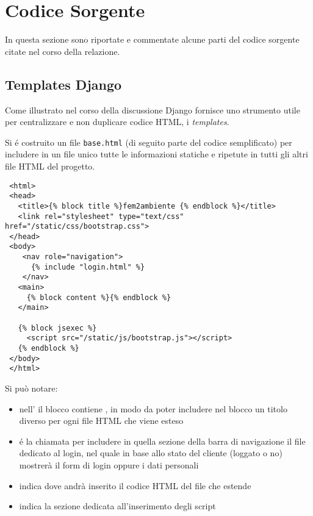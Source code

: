 \chapter{Codice Sorgente}
\label{app:codice}

In questa sezione sono riportate e commentate alcune parti del codice sorgente citate nel corso della relazione.

\section*{Templates Django}
\label{app:templates}

Come illustrato nel corso della discussione Django fornisce uno strumento utile per centralizzare e non duplicare codice HTML, i \emph{templates}.

Si é costruito un file \texttt{base.html} (di seguito parte del codice semplificato) per includere in un file unico tutte le informazioni statiche e ripetute in tutti gli altri file HTML del progetto.

\begin{footnotesize}
\begin{verbatim}
 <html>
 <head>
   <title>{% block title %}fem2ambiente {% endblock %}</title>
   <link rel="stylesheet" type="text/css" href="/static/css/bootstrap.css">
 </head>
 <body>
    <nav role="navigation">                        
      {% include "login.html" %}
    </nav>   
   <main>
     {% block content %}{% endblock %}
   </main>

   {% block jsexec %}
     <script src="/static/js/bootstrap.js"></script>
   {% endblock %}
 </body>
 </html>
\end{verbatim}
\end{footnotesize}

Si può notare:
\begin{itemize}
 \item nell' il blocco  contiene , in modo da poter includere nel blocco un titolo diverso per ogni file HTML che viene esteso
 \item {} é la chiamata per includere in quella sezione della barra di navigazione il file dedicato al login, nel quale in base allo stato del cliente (loggato o no) mostrerà il form di login oppure i dati personali
 \item {} indica dove andrà inserito il codice HTML del file che estende
 \item {} indica la sezione dedicata all'inserimento degli script {\js}
\end{itemize}


